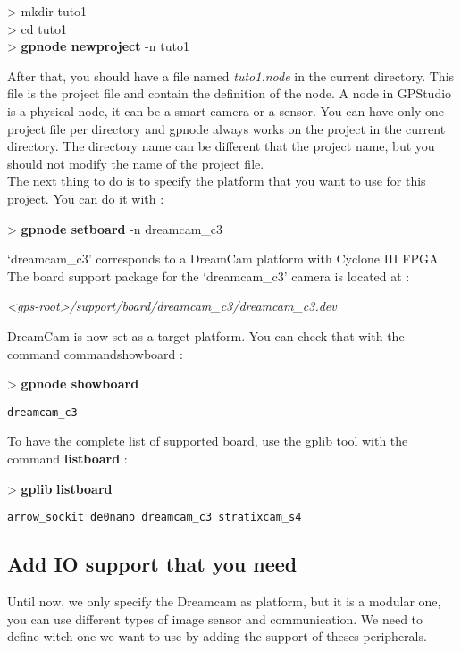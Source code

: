 \documentclass[10pt,a4paper]{article}
\begin{document}
\begin{sample}
> mkdir tuto1\\
> cd tuto1\\
> \textbf{gpnode newproject} -n tuto1
\end{sample}

After that, you should have a file named \emph{tuto1.node} in the current directory. This file is the project file and contain the definition of the node. A node in GPStudio is a physical node, it can be a smart camera or a sensor. You can have only one project file per directory and gpnode always works on the project in the current directory. The directory name can be different that the project name, but you should not modify the name of the project file.\\

The next thing to do is to specify the platform that you want to use for this project. You can do it with :

\begin{sample}
> \textbf{gpnode setboard} -n dreamcam\_c3
\end{sample}

`dreamcam\_c3' corresponds to a DreamCam platform with Cyclone III FPGA. The board support package for the `dreamcam\_c3' camera is located at :

\emph{<gps-root>/support/board/dreamcam\_c3/dreamcam\_c3.dev}

DreamCam is now set as a target platform. You can check that with the command command{showboard} :

\begin{sample}
> \textbf{gpnode showboard}
\begin{Verbatim}
dreamcam_c3
\end{Verbatim}
\end{sample}

To have the complete list of supported board, use the gplib tool with the command \textbf{listboard} :

\begin{sample}
> \textbf{gplib} \textbf{listboard}
\begin{Verbatim}
arrow_sockit de0nano dreamcam_c3 stratixcam_s4
\end{Verbatim}
\end{sample}

\subsection{Add IO support that you need}
Until now, we only specify the Dreamcam as platform, but it is a modular one, you can use different types of image sensor and communication. We need to define witch one we want to use by adding the support of theses peripherals. \\
\end{document}
